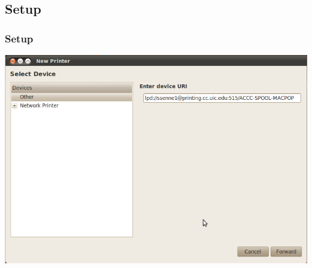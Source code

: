 \documentclass[hyperref={pdfpagelabels=false}]{beamer}
\begin{document}
\subsection{Setup}
\frame
{
    \frametitle{Setup}
     \includegraphics[totalheight=0.8\textheight]{PrinterURI.png}
}
\end{document}
